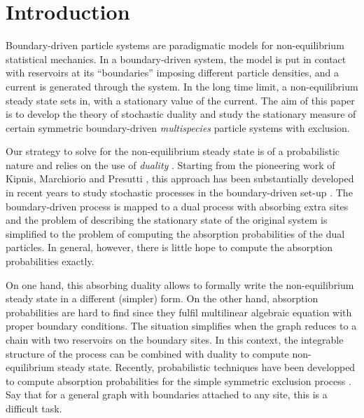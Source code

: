 \documentclass[10pt]{article}
\numberwithin{equation}{section}
\numberwithin{equation}{subsection}
\begin{document}

\newpage
\tableofcontents

 \newpage
\section{Introduction} 
Boundary-driven particle systems are paradigmatic models for non-equilibrium statistical mechanics. In a boundary-driven system, the model is put in contact with reservoirs at its {\color{red}``boundaries'' } imposing different particle densities, and a current is generated through the system. In the long time limit, a non-equilibrium steady state sets in, with a stationary value of the current.
 The aim of this paper is to develop the theory of stochastic duality and  study the stationary measure of certain symmetric boundary-driven {\em multispecies} particle systems with exclusion.

Our strategy to solve for the non-equilibrium steady state is of a probabilistic nature and relies on the use of {\em duality} \cite{schutzSandow}. Starting from the pioneering work of Kipnis, Marchiorio and Presutti \cite{KMP}, this approach
has been substantially developed in recent years to study stochastic processes in the boundary-driven set-up \cite{giardina2009duality,carinci2013duality}.
The boundary-driven process is mapped to a dual process with absorbing extra sites and the problem of describing the stationary state of the original system
is simplified to the problem of computing the absorption probabilities of the dual particles. In general, however,  there is little hope to compute the absorption probabilities exactly. 


{\color{blue}On one hand, this absorbing duality allows to formally write the non-equilibrium steady state in a different (simpler) form. On the other hand, absorption probabilities are hard to find since they fulfil multilinear algebraic equation with proper boundary conditions. The situation simplifies when the graph reduces to a chain with two reservoirs on the boundary sites. In this context, the integrable structure of the process can be combined with duality to compute non-equilibrium steady state. Recently, probabilistic techniques have been developped to compute absorption probabilities for the simple symmetric exclusion process \cite{floreani2023non}.}
{\color{red} Say that for a  general graph with boundaries attached to any site, this is a difficult task. }
\end{document}
